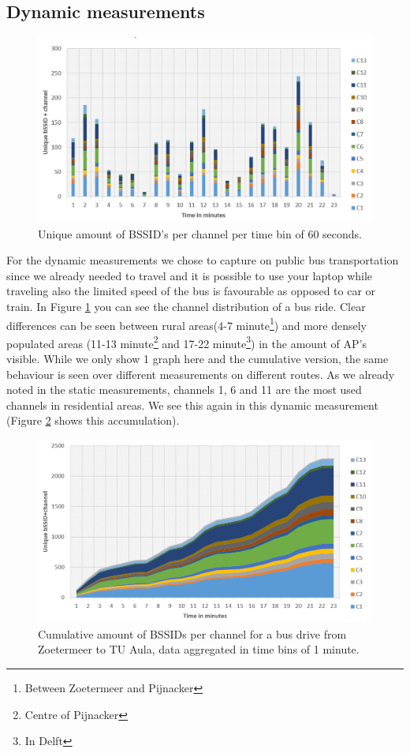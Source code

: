 \documentclass[11pt,a4paper]{article}
\begin{document}
\subsection{Dynamic measurements}
\begin{figure}[h!]
\centering
\includegraphics[scale=0.45]{NoncumuDynamicGraph.png}
\caption{Unique amount of BSSID's per channel per time bin of 60 seconds.}
\label{fig:dynamic_zoetermeer_aula}
\end{figure}
For the dynamic measurements we chose to capture on public bus transportation since we already needed to travel and it is possible to use your laptop while traveling also the limited speed of the bus is favourable as opposed to car or train. In Figure \ref{fig:dynamic_zoetermeer_aula} you can see the channel distribution of a bus ride. Clear differences can be seen between rural areas(4-7 minute\footnote{Between Zoetermeer and Pijnacker}) and more densely populated areas (11-13 minute\footnote{Centre of Pijnacker} and 17-22 minute\footnote{In Delft}) in the amount of AP's visible. While we only show 1 graph here and the cumulative version, the same behaviour is seen over different measurements on different routes. As we already noted in the static measurements, channels 1, 6 and 11 are the most used channels in residential areas. We see this again in this dynamic measurement (Figure \ref{fig:dynamic_zoetermeer_aula_cumu} shows this accumulation).

\begin{figure}[h!]
\centering
\includegraphics[scale=0.45]{ChosenGraphDynamic.png}
\caption{Cumulative amount of BSSIDs per channel for a bus drive from Zoetermeer to TU Aula, data aggregated in time bins of 1 minute.}
\label{fig:dynamic_zoetermeer_aula_cumu}
\end{figure}
\end{document}
